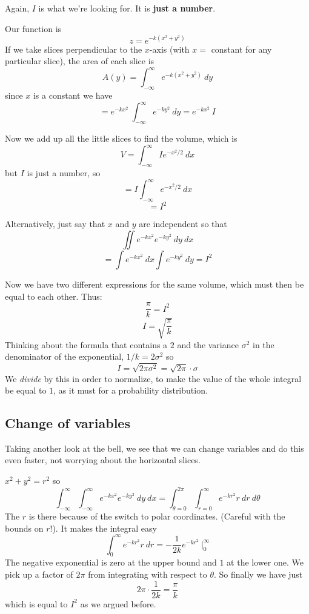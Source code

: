 \documentclass[11pt, oneside]{article}   	%
\begin{document}
Again, $I$ is what we're looking for.  It is \textbf{just a number}.  

Our function is
\[ z = e^{-k(x^2 + y^2)} \]
If we take slices perpendicular to the $x$-axis (with $x =$ constant for any particular slice), the area of each slice is
\[ A(y) = \int_{-\infty}^{\infty} e^{-k(x^2 + y^2)} \ dy \]
since  $x$ is a constant we have
\[ = e^{-kx^2} \ \int_{-\infty}^{\infty} e^{-ky^2} \ dy = e^{-kx^2} \ I \]

Now we add up all the little slices to find the volume, which is
\[  V =  \int_{-\infty}^{\infty} I e^{-x^2/2} \ dx \]
but $I$ is just a number, so
\[  =  I \int_{-\infty}^{\infty} e^{-x^2/2} \ dx \]
\[ = I^2 \]

Alternatively, just say that $x$ and $y$ are independent so that
\[ \iint e^{-kx^2} e^{-ky^2} \ dy \ dx \]
\[ = \int e^{-kx^2} \ dx \int e^{-ky^2} \ dy = I^2 \]

Now we have two different expressions for the same volume, which must then be equal to each other.  Thus:
\[ \frac{\pi}{k} = I^2 \]
\[ I = \sqrt{\frac{\pi}{k}} \]
Thinking about the formula that contains a $2$ and the variance $\sigma^2$ in the denominator of the exponential, $1/k = 2 \sigma^2$ so
\[ I = \sqrt{2 \pi \sigma^2 }   = \sqrt{2 \pi } \cdot \sigma \]
We \emph{divide} by this in order to normalize, to make the value of the whole integral be equal to $1$, as it must for a probability distribution.

\subsection*{Change of variables}
Taking another look at the bell, we see that we can change variables and do this even faster, not worrying about the horizontal slices.

$x^2 + y^2 = r^2$ so
\[ \int_{-\infty}^{\infty} \int_{-\infty}^{\infty} e^{-kx^2} e^{-ky^2} \ dy \ dx = \int_{\theta = 0}^{2 \pi} \int_{r=0}^{\infty} e^{-kr^2} r \ dr \ d \theta \]
The $r$ is there because of the switch to polar coordinates.  (Careful with the bounds on $r$!).  It makes the integral easy
\[  \int_{0}^{\infty} e^{-kr^2} r \ dr  = -\frac{1}{2k} e^{-kr^2} \ \bigg |_0^{\infty} \]
The negative exponential is zero at the upper bound and $1$ at the lower one.  We pick up a factor of $2 \pi$ from integrating with respect to $\theta$.  So finally we have just
\[ 2 \pi \cdot \frac{1}{2k} = \frac{\pi}{k} \]
which is equal to $I^2$ as we argued before.
\end{document}
